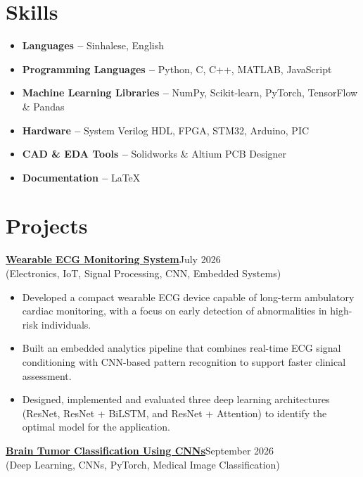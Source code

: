 \documentclass[10pt,a4paper]{article}
\begin{document}
\section*{Skills}

\begin{itemize}[leftmargin=*]
    \item \textbf{Languages -- }Sinhalese, English
    \item \textbf{Programming Languages -- }Python, C, C++, MATLAB, JavaScript
    \item \textbf{Machine Learning Libraries -- }NumPy, Scikit-learn, PyTorch, TensorFlow \& Pandas
    \item \textbf{Hardware -- }System Verilog HDL, FPGA, STM32, Arduino, PIC
    \item \textbf{CAD \& EDA Tools -- }Solidworks \& Altium PCB Designer
    \item \textbf{Documentation -- }LaTeX
\end{itemize}



\section*{Projects}



\href{https://github.com/IdeaDP/Wearable-ECG-Monitoring-System}{\textbf{Wearable ECG Monitoring System}}\hfill July 2026 \\
(Electronics, IoT, Signal Processing, CNN, Embedded Systems)

\begin{itemize}
    \item Developed a compact wearable ECG device capable of long-term ambulatory cardiac monitoring, with a focus on early detection of abnormalities in high-risk individuals.
    \item Built an embedded analytics pipeline that combines real-time ECG signal conditioning with CNN-based pattern recognition to support faster clinical assessment.
    \item Designed, implemented and evaluated three deep learning architectures (ResNet, ResNet + BiLSTM, and ResNet + Attention) to identify the optimal model for the application.
\end{itemize}

\vspace{0.3cm}
\href{https://github.com/TharushaNimesh22/Brain-Tumor-classification-using-a-Simple-convolutional-neural-network-CNN-}{\textbf{Brain Tumor Classification Using CNNs}}\hfill September 2026 \\
(Deep Learning, CNNs, PyTorch, Medical Image Classification)
\end{document}
